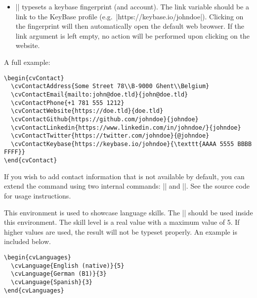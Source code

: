 \documentclass{ltxdoc}
\begin{document}
\begin{itemize}
    \item \DescribeMacro{\cvContactKeybase} || typesets a keybase fingerprint (and account). The link variable should be a link to the KeyBase profile (e.g.\ |https://keybase.io/johndoe|). Clicking on the fingerprint will then automatically open the default web browser. If the link argument is left empty, no action will be performed upon clicking on the website.
  \end{itemize}
  
  A full example:
  \begin{lstlisting}
\begin{cvContact}
  \cvContactAddress{Some Street 78\\B-9000 Ghent\\Belgium}
  \cvContactEmail{mailto:john@doe.tld}{john@doe.tld}
  \cvContactPhone{+1 781 555 1212}
  \cvContactWebsite{https://doe.tld}{doe.tld}
  \cvContactGithub{https://github.com/johndoe}{johndoe}
  \cvContactLinkedin{https://www.linkedin.com/in/johndoe/}{johndoe}
  \cvContactTwitter{https://twitter.com/johndoe}{@johndoe}
  \cvContactKeybase{https://keybase.io/johndoe}{\texttt{AAAA 5555 BBBB FFFF}}
\end{cvContact}
  \end{lstlisting}

  If you wish to add contact information that is not available by default, you can extend the command using two internal commands: |\cv@ContactTemplateLink| and |\cv@ContactTemplate|. See the source code for usage instructions.

   This environment is used to showcase language skills. The \DescribeMacro{\cvLanguage} || should be used inside this environment. The skill level is a real value with a maximum value of 5. If higher values are used, the result will not be typeset properly. An example is included below.

  \begin{lstlisting}
\begin{cvLanguages}
  \cvLanguage{English (native)}{5}
  \cvLanguage{German (B1)}{3}
  \cvLanguage{Spanish}{3}
\end{cvLanguages}  
  \end{lstlisting}
\end{document}
